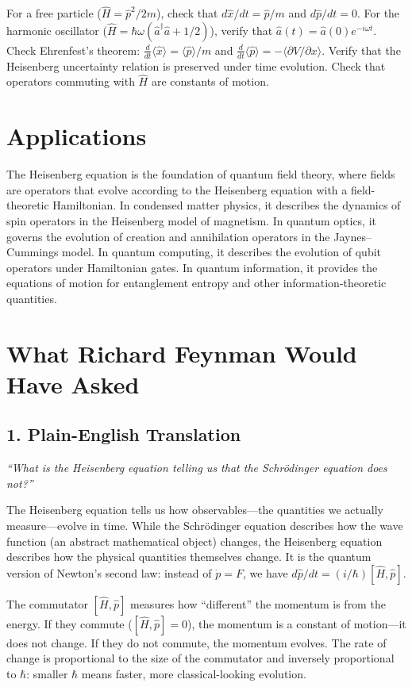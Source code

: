 For a free particle ($\hat{H} = \hat{p}^2/2m$), check that $d\hat{x}/dt = \hat{p}/m$ and $d\hat{p}/dt = 0$. For the harmonic oscillator ($\hat{H} = \hbar\omega(\hat{a}^\dagger\hat{a} + 1/2)$), verify that $\hat{a}(t) = \hat{a}(0)e^{-i\omega t}$. Check Ehrenfest's theorem: $\frac{d}{dt}\langle\hat{x}\rangle = \langle\hat{p}\rangle/m$ and $\frac{d}{dt}\langle\hat{p}\rangle = -\langle\partial V/\partial x\rangle$. Verify that the Heisenberg uncertainty relation is preserved under time evolution. Check that operators commuting with $\hat{H}$ are constants of motion.
\section*{Applications}

The Heisenberg equation is the foundation of quantum field theory, where fields are operators that evolve according to the Heisenberg equation with a field-theoretic Hamiltonian. In condensed matter physics, it describes the dynamics of spin operators in the Heisenberg model of magnetism. In quantum optics, it governs the evolution of creation and annihilation operators in the Jaynes--Cummings model. In quantum computing, it describes the evolution of qubit operators under Hamiltonian gates. In quantum information, it provides the equations of motion for entanglement entropy and other information-theoretic quantities.
\section*{What Richard Feynman Would Have Asked}

\subsection*{1. Plain-English Translation}
\textit{``What is the Heisenberg equation telling us that the Schr\"odinger equation does not?''}

The Heisenberg equation tells us how observables---the quantities we actually measure---evolve in time. While the Schr\"odinger equation describes how the wave function (an abstract mathematical object) changes, the Heisenberg equation describes how the physical quantities themselves change. It is the quantum version of Newton's second law: instead of $\dot{p} = F$, we have $d\hat{p}/dt = (i/\hbar)[\hat{H}, \hat{p}]$.

The commutator $[\hat{H}, \hat{p}]$ measures how ``different'' the momentum is from the energy. If they commute ($[\hat{H}, \hat{p}] = 0$), the momentum is a constant of motion---it does not change. If they do not commute, the momentum evolves. The rate of change is proportional to the size of the commutator and inversely proportional to $\hbar$: smaller $\hbar$ means faster, more classical-looking evolution.


